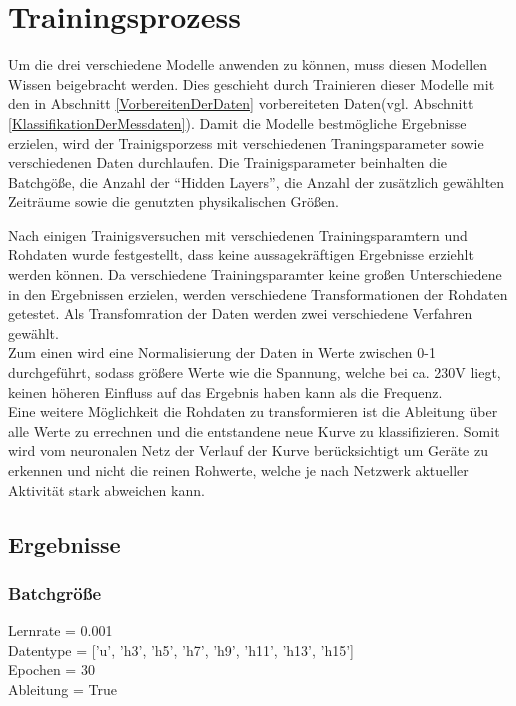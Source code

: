 \section{Trainingsprozess}
    Um die drei verschiedene Modelle anwenden zu können, muss diesen Modellen Wissen beigebracht werden.
    Dies geschieht durch Trainieren dieser Modelle mit den in Abschnitt \ref{VorbereitenDerDaten} vorbereiteten Daten(vgl. Abschnitt \ref{KlassifikationDerMessdaten}).
    Damit die Modelle bestmögliche Ergebnisse erzielen, wird der Trainigsporzess mit verschiedenen Traningsparameter sowie verschiedenen Daten durchlaufen.
    Die Trainigsparameter beinhalten die Batchgöße, die Anzahl der "`Hidden Layers"', die Anzahl der zusätzlich gewählten Zeiträume sowie die genutzten physikalischen Größen.
    \newline

    \noindent
    Nach einigen Trainigsversuchen mit verschiedenen Trainingsparamtern und Rohdaten wurde festgestellt, dass keine aussagekräftigen Ergebnisse erziehlt werden können.
    Da verschiedene Trainingsparamter keine großen Unterschiedene in den Ergebnissen erzielen, werden verschiedene Transformationen der Rohdaten getestet.
    Als Transfomration der Daten werden zwei verschiedene Verfahren gewählt. \\
    \noindent
    Zum einen wird eine Normalisierung der Daten in Werte zwischen 0-1 durchgeführt, sodass größere Werte wie die Spannung, welche bei ca. 230V liegt, keinen höheren Einfluss auf das Ergebnis haben kann als die Frequenz.\\
    \noindent
    Eine weitere Möglichkeit die Rohdaten zu transformieren ist die Ableitung über alle Werte zu errechnen und die entstandene neue Kurve zu klassifizieren.
    Somit wird vom neuronalen Netz der Verlauf der Kurve berücksichtigt um Geräte zu erkennen und nicht die reinen Rohwerte, welche je nach Netzwerk aktueller Aktivität stark abweichen kann.
    
    \subsection{Ergebnisse}

    \subsubsection{Batchgröße}

    Lernrate = 0.001\\
    \noindent
    Datentype = ['u', 'h3', 'h5', 'h7', 'h9', 'h11', 'h13', 'h15']\\
    \noindent
    Epochen = 30\\
    \noindent
    Ableitung = True\\

